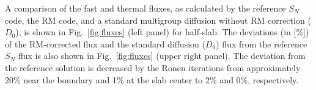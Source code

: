 A comparison of the fast and thermal fluxes, as calculated by the reference $S_N$ code, the RM code, and a standard multigroup diffusion without RM correction ($D_0$), is shown in Fig.~\ref{fig:fluxes} (left panel) for half-slab. The deviations (in [\%]) of the RM-corrected flux and the standard diffusion ($D_0$) flux from the reference $S_N$ flux is also shown in Fig.~\ref{fig:fluxes} (upper right panel). The deviation from the reference solution is decreased by the Ronen iterations from approximately 20\% near the boundary and 1\% at the slab center to 2\% and 0\%, respectively. 


